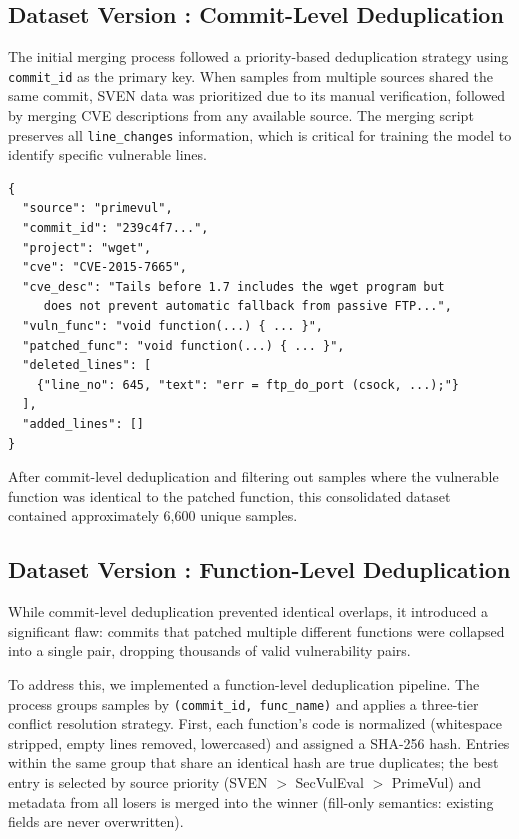 \documentclass[12pt,a4paper]{article}
\makeatletter
\newcounter{DataVer}
\newcommand{\dataversion}[2]{%
  \stepcounter{DataVer}%
  \subsection{Dataset Version \theDataVer: #1}%
  \protected@edef\@currentlabel{\theDataVer}\label{#2}%
}
\makeatother
\begin{document}
\dataversion{Commit-Level Deduplication}{ver:data_commit}
The initial merging process followed a priority-based deduplication strategy using \texttt{commit\_id} as the primary key. When samples from multiple sources shared the same commit, SVEN data was prioritized due to its manual verification, followed by merging CVE descriptions from any available source. The merging script preserves all \texttt{line\_changes} information, which is critical for training the model to identify specific vulnerable lines.

\begin{lstlisting}[caption={Example of a merged dataset entry (structure)}]
{
  "source": "primevul",
  "commit_id": "239c4f7...",
  "project": "wget",
  "cve": "CVE-2015-7665",
  "cve_desc": "Tails before 1.7 includes the wget program but 
     does not prevent automatic fallback from passive FTP...",
  "vuln_func": "void function(...) { ... }",
  "patched_func": "void function(...) { ... }",
  "deleted_lines": [
    {"line_no": 645, "text": "err = ftp_do_port (csock, ...);"}
  ],
  "added_lines": []
}
\end{lstlisting}

After commit-level deduplication and filtering out samples where the vulnerable function was identical to the patched function, this consolidated dataset contained approximately 6,600 unique samples.

\dataversion{Function-Level Deduplication}{ver:data_func}
While commit-level deduplication prevented identical overlaps, it introduced a significant flaw: commits that patched multiple different functions were collapsed into a single pair, dropping thousands of valid vulnerability pairs.

To address this, we implemented a function-level deduplication pipeline. The process groups samples by \texttt{(commit\_id, func\_name)} and applies a three-tier conflict resolution strategy. First, each function's code is normalized (whitespace stripped, empty lines removed, lowercased) and assigned a SHA-256 hash. Entries within the same group that share an identical hash are true duplicates; the best entry is selected by source priority (SVEN $>$ SecVulEval $>$ PrimeVul) and metadata from all losers is merged into the winner (fill-only semantics: existing fields are never overwritten).
\end{document}
